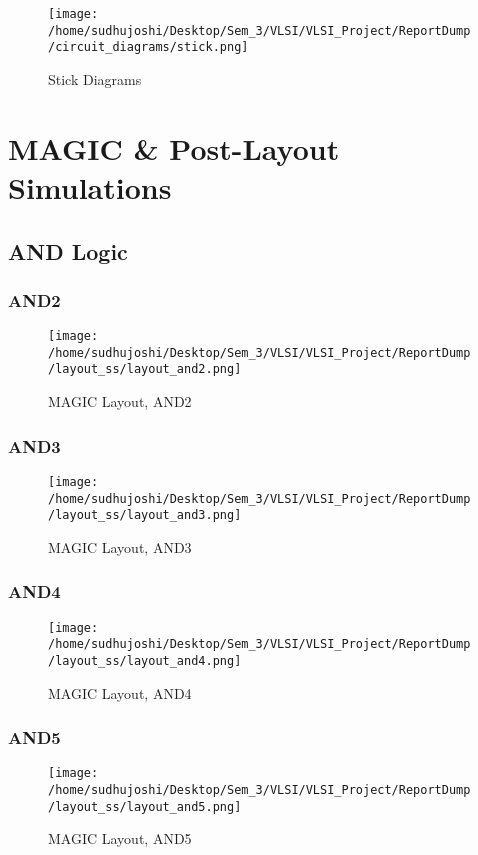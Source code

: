 \documentclass[conference]{IEEEtran}
\begin{document}
\begin{figure}[H] 
    \centering
    \texttt{[image: /home/sudhujoshi/Desktop/Sem\_3/VLSI/VLSI\_Project/ReportDump/circuit\_diagrams/stick.png]}
    \caption{Stick Diagrams} 
\end{figure}

\clearpage

\section{MAGIC \& Post-Layout Simulations}

\subsection{AND Logic}
\subsubsection{AND2}
\begin{figure}[H] 
    \centering
    \texttt{[image: /home/sudhujoshi/Desktop/Sem\_3/VLSI/VLSI\_Project/ReportDump/layout\_ss/layout\_and2.png]}
    \caption{MAGIC Layout, AND2} 
\end{figure}

\subsubsection{AND3}
\begin{figure}[H] 
    \centering
    \texttt{[image: /home/sudhujoshi/Desktop/Sem\_3/VLSI/VLSI\_Project/ReportDump/layout\_ss/layout\_and3.png]}
    \caption{MAGIC Layout, AND3} 
\end{figure}

\subsubsection{AND4}
\begin{figure}[H] 
    \centering
    \texttt{[image: /home/sudhujoshi/Desktop/Sem\_3/VLSI/VLSI\_Project/ReportDump/layout\_ss/layout\_and4.png]}
    \caption{MAGIC Layout, AND4} 
\end{figure}

\subsubsection{AND5}
\begin{figure}[H] 
    \centering
    \texttt{[image: /home/sudhujoshi/Desktop/Sem\_3/VLSI/VLSI\_Project/ReportDump/layout\_ss/layout\_and5.png]}
    \caption{MAGIC Layout, AND5} 
\end{figure}
\end{document}
